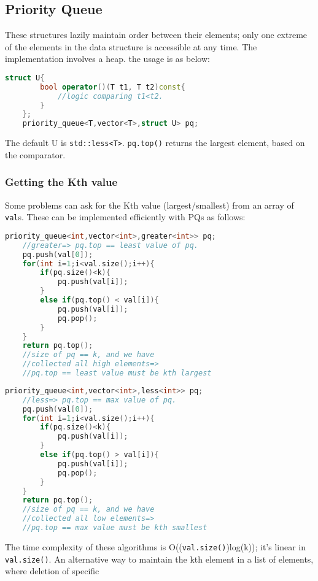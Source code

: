\documentclass{article}
\begin{document}
\subsection{Priority Queue}
These structures lazily maintain order between their elements; only 
one extreme of the elements in the data structure is accessible at 
any time. The implementation involves a heap. the usage is as below:
\begin{lstlisting}[caption={Priority Queue},language=C++]
    struct U{
        bool operator()(T t1, T t2)const{
            //logic comparing t1<t2.
        }
    };
    priority_queue<T,vector<T>,struct U> pq;
\end{lstlisting}
The default U is \texttt{std::less<T>}. \texttt{pq.top()} returns
the largest element, based on the comparator.
\subsubsection{Getting the Kth value}
Some problems can ask for the Kth value (largest/smallest) from an
array of \texttt{val}s. These can be implemented
efficiently with PQs as follows:
\begin{lstlisting}[caption={Kth Largest Element},language=C++]
    priority_queue<int,vector<int>,greater<int>> pq;
    //greater=> pq.top == least value of pq.
    pq.push(val[0]);
    for(int i=1;i<val.size();i++){
        if(pq.size()<k){
            pq.push(val[i]);
        }
        else if(pq.top() < val[i]){
            pq.push(val[i]);
            pq.pop();
        }
    }
    return pq.top();
    //size of pq == k, and we have 
    //collected all high elements=>
    //pq.top == least value must be kth largest
\end{lstlisting}
\begin{lstlisting}[caption={Kth Smallest Element},language=C++]
    priority_queue<int,vector<int>,less<int>> pq;
    //less=> pq.top == max value of pq.
    pq.push(val[0]);
    for(int i=1;i<val.size();i++){
        if(pq.size()<k){
            pq.push(val[i]);
        }
        else if(pq.top() > val[i]){
            pq.push(val[i]);
            pq.pop();
        }
    }
    return pq.top();
    //size of pq == k, and we have 
    //collected all low elements=>
    //pq.top == max value must be kth smallest
\end{lstlisting}
The time complexity of these algorithms is
O((\texttt{val.size()})log(k)); it's linear in
\texttt{val.size()}.
An alternative way to maintain the kth element
in a list of elements, where deletion of specific
\end{document}
